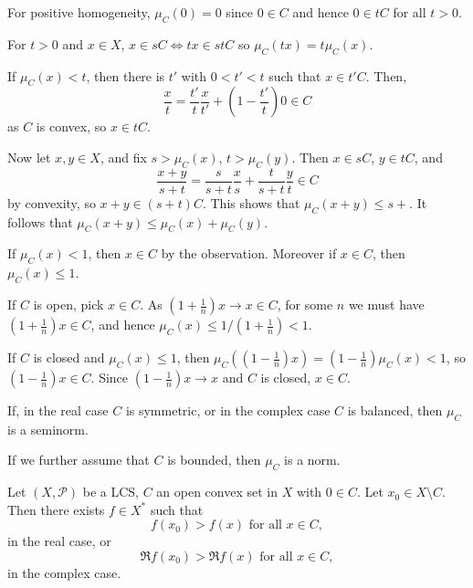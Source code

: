 \documentclass[12pt]{article}
\begin{document}
\begin{proofbox}
	

	For positive homogeneity, $\mu_C(0) = 0$ since $0 \in C$ and hence $0 \in tC$ for all $t>0$.

	For $t > 0$ and $x \in X$, $x \in s C \iff t x \in s t C$ so $\mu_C(tx) = t\mu_C(x)$.

	If $\mu_C(x) < t$, then there is $t'$ with $0 < t' < t$ such that $x \in t' C$. Then,
	\[
	\frac{x}{t} = \frac{t'}{t} \frac{x}{t'} + \left(1 - \frac{t'}{t} \right) 0 \in C
	\]
	as $C$ is convex, so $x \in tC$.

	Now let $x,y  \in X$, and fix $s > \mu_C(x)$, $t > \mu_C(y)$. Then $x \in sC$, $y \in tC$, and
	\[
	\frac{x + y}{s + t} = \frac{s}{s + t} \frac{x}{s} + \frac{t}{s + t} \frac{y}{t} \in C
	\]
	by convexity, so $x + y \in (s + t) C$. This shows that $\mu_C(x + y) \leq s + $. It follows that $\mu_C(x + y) \leq \mu_C(x) + \mu_C(y)$.

	If $\mu_C(x) < 1$, then $x \in C$ by the observation. Moreover if $x \in C$, then $\mu_C(x) \leq 1$.

	If $C$ is open, pick $x \in C$. As $(1 + \frac{1}{n})x \to x \in C$, for some $n$ we must have $(1 + \frac{1}{n})x \in C$, and hence $\mu_C(x) \leq 1/(1 + \frac{1}{n}) < 1$.

	If $C$ is closed and $\mu_C(x) \leq 1$, then $\mu_C((1 - \frac{1}{n})x) = (1 - \frac{1}{n}) \mu_C(x) < 1$, so $(1 - \frac 1n)x \in C$. Since $(1 - \frac 1n ) x \to x$ and $C$ is closed, $x \in C$.
\end{proofbox}

\begin{remark}
	If, in the real case $C$ is symmetric, or in the complex case $C$ is balanced, then $\mu_C$ is a seminorm.

	If we further assume that $C$ is bounded, then $\mu_C$ is a norm.
\end{remark}

\begin{theorem}
	Let $(X, \mathcal{P})$ be a LCS, $C$ an open convex set in $X$ with $0 \in C$. Let $x_0 \in X \setminus C$. Then there exists $f \in X^{\ast}$ such that
	\[
		f(x_0) > f(x) \text{ for all }x \in C,
	\]
	in the real case, or
	\[
		\Re f(x_0) > \Re f(x) \text{ for all } x \in C,
	\]
	in the complex case.
\end{theorem}
\end{document}
